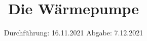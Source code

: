 

\subject{V206}
\title{Die Wärmepumpe}
\date{
  Durchführung: 16.11.2021
  \hspace{3em}
  Abgabe: 7.12.2021
}



\maketitle
\thispagestyle{empty}
\tableofcontents
\newpage








\printbibliography{}


